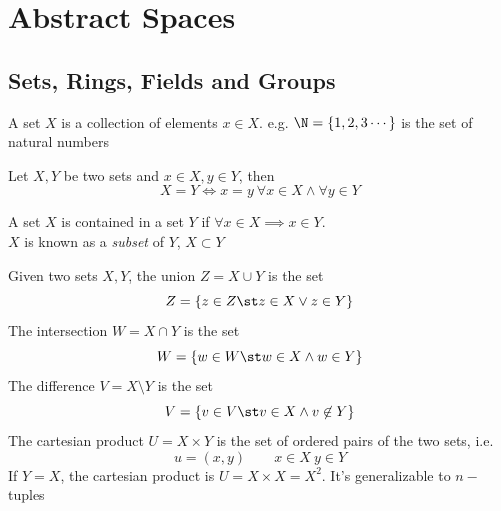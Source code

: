 \documentclass[../mmf.tex]{subfiles}
\begin{document}
\chapter{Abstract Spaces}
\section{Sets, Rings, Fields and Groups}
\begin{dfn}[Set]
	A set $X$ is a collection of elements $x\in X$. e.g. $\N=\left\{ 1, 2, 3\cdots \right\}$ is the set of natural numbers
\end{dfn}
\begin{thm}
	Let $X, Y$ be two sets and $x\in X, y\in Y$, then
	\begin{equation*}
		X=Y\iff{}x=y\ \forall x\in X\wedge\forall y\in Y
	\end{equation*}
\end{thm}
\begin{dfn}[Subset]
	A set $X$ is contained in a set $Y$ if $\forall x\in X\implies{}x\in Y$.\\
	$X$ is known as a \textit{subset} of $Y$, $X\subset Y$
\end{dfn}
\begin{dfn}
	Given two sets $X, Y$, the union $Z=X\cup Y$ is the set
	\begin{equation*}
		Z=\left\{ z\in Z\st z\in X\vee z\in Y \right\}
	\end{equation*}
	The intersection $W=X\cap Y$ is the set
	\begin{equation*}
		W=\left\{ w\in W\st w\in X\wedge w\in Y \right\}
	\end{equation*}
	The difference $V=X\setminus Y$ is the set
	\begin{equation*}
		V=\left\{ v\in V\st v\in X\wedge v\not\in Y \right\}
	\end{equation*}
	The cartesian product $U=X\times Y$ is the set of ordered pairs of the two sets, i.e.
	\begin{equation*}
		u=(x, y)\qquad x\in X\ y\in Y
	\end{equation*}
	If $Y=X$, the cartesian product is $U=X\times X=X^2$. It's generalizable to $n-$tuples
\end{dfn}
\end{document}

